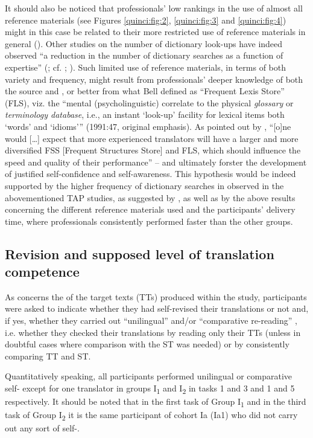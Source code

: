 \documentclass[output=paper]{LSP/langsci}
\begin{document}
It should also be noticed that professionals' low rankings in the use of almost all reference materials (see Figures \ref{quinci:fig:2}, \ref{quinci:fig:3} and \ref{quinci:fig:4}) might in this case be related to their more restricted use of reference materials in general (). Other studies on the number of dictionary look-ups have indeed observed ``a reduction in the number of dictionary searches as a function of expertise'' (\citealt[200]{Lesznyak2008}; cf. \citealt[113]{Jensen1999}; \citealt[588]{Ronowicz2005}). Such limited use of reference materials, in terms of both variety and frequency, might result from professionals' deeper knowledge of both the source and , or better from what Bell defined as ``Frequent Lexis Store'' (FLS), viz. the ``mental (psycholinguistic) correlate to the physical \textit{glossary} or \textit{terminology database}, i.e., an instant `look-up' facility for lexical items both `words' and `idioms''' (1991:47, original emphasis). As pointed out by \citet[583]{Ronowicz2005}, ``[o]ne would [\ldots] expect that more experienced translators will have a larger and more diversified FSS [Frequent Structures Store] and FLS, which should influence the speed and quality of their performance'' -- and ultimately forster the development of justified self-confidence and self-awareness. This hypothesis would be indeed supported by the higher frequency of dictionary searches in  observed in the abovementioned TAP studies, as suggested by \citet[589]{Ronowicz2005}, as well as by the above results concerning the different reference materials used and the participants' delivery time, where professionals consistently performed faster than the other groups.

\subsection{Revision and supposed level of translation competence}

As concerns the  of the target texts (TTs) produced within the study, participants were asked to indicate whether they had self-revised their translations or not and, if yes, whether they carried out ``unilingual'' and/or ``comparative re-reading'' \citep[App. 5]{Mossop2014Revising3rd}, i.e. whether they checked their translations by reading only their TTs (unless in doubtful cases where comparison with the ST was needed) or by consistently comparing TT and ST.

Quantitatively speaking, all participants performed unilingual or comparative self- except for one translator in groups I\textsubscript{1} and I\textsubscript{2} in tasks 1 and 3 and 1 and 5 respectively. It should be noted that in the first task of Group I\textsubscript{1} and in the third task of Group I\textsubscript{2} it is the same participant of cohort Ia (Ia1) who did not carry out any sort of self-.
\end{document}
